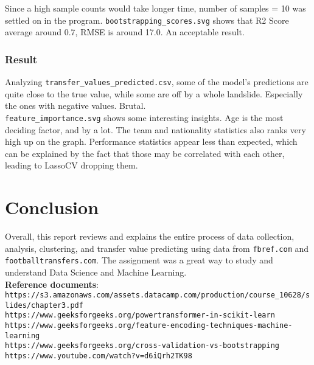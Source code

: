 \documentclass{report}
\begin{document}
\noindent Since a high sample counts would take longer time, number of samples = 10 was settled on in the program.
\verb|bootstrapping_scores.svg| shows that R2 Score average around 0.7, RMSE is around 17.0. An 
acceptable result.

\subsubsection{Result}
Analyzing \verb|transfer_values_predicted.csv|, some of the model's predictions are quite close to
the true value, while some are off by a whole landslide. Especially the ones with negative values. 
Brutal. \\
\verb|feature_importance.svg| shows some interesting insights. Age is the most deciding factor, and
by a lot. The team and nationality statistics also ranks very high up on the graph. Performance 
statistics appear less than expected, which can be explained by the fact that those may be correlated 
with each other, leading to LassoCV dropping them.

\section{Conclusion}
Overall, this report reviews and explains the entire process of data collection, analysis, clustering, and 
transfer value predicting using data from \verb|fbref.com| and \verb|footballtransfers.com|. 
The assignment was a great way to study and understand Data Science and Machine Learning. \\

\textbf{Reference documents}: \\
{\small \verb|https://s3.amazonaws.com/assets.datacamp.com/production/course_10628/slides/chapter3.pdf|} \\
{\small \verb|https://www.geeksforgeeks.org/powertransformer-in-scikit-learn|} \\ 
{\small \verb|https://www.geeksforgeeks.org/feature-encoding-techniques-machine-learning|} \\
{\small \verb|https://www.geeksforgeeks.org/cross-validation-vs-bootstrapping|} \\
{\small \verb|https://www.youtube.com/watch?v=d6iQrh2TK98|} \\
\end{document}
